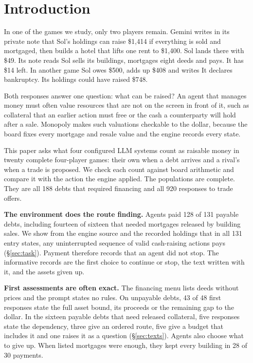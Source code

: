\section{Introduction}

In one of the games we study, only two players remain. Gemini writes in its private note that Sol's holdings can raise \$1,414 if everything is sold and mortgaged, then builds a hotel that lifts one rent to \$1,400. Sol lands there with \$49. Its note reads  Sol sells its buildings, mortgages eight deeds and pays. It has \$14 left. In another game Sol owes \$500, adds up \$408 and writes  It declares bankruptcy. Its holdings could have raised \$748.

Both responses answer one question: what can be raised? An agent that manages money must often value resources that are not on the screen in front of it, such as collateral that an earlier action must free or the cash a counterparty will hold after a sale. Monopoly makes such valuations checkable to the dollar, because the board fixes every mortgage and resale value and the engine records every state.

This paper asks what four configured LLM systems count as raisable money in twenty complete four-player games: their own when a debt arrives and a rival's when a trade is proposed. We check each count against board arithmetic and compare it with the action the engine applied. The populations are complete. They are all 188 debts that required financing and all 920 responses to trade offers.

\textbf{The environment does the route finding.} Agents paid 128 of 131 payable debts, including fourteen of sixteen that needed mortgages released by building sales. We show from the engine source and the recorded holdings that in all 131 entry states, any uninterrupted sequence of valid cash-raising actions pays (\S\ref{sec:task}). Payment therefore records that an agent did not stop. The informative records are the first choice to continue or stop, the text written with it, and the assets given up.

\textbf{First assessments are often exact.} The financing menu lists deeds without prices and the prompt states no rules. On unpayable debts, 43 of 48 first responses state the full asset bound, its proceeds or the remaining gap to the dollar. In the sixteen payable debts that need released collateral, five responses state the dependency, three give an ordered route, five give a budget that includes it and one raises it as a question (\S\ref{sec:texts}). Agents also choose what to give up. When listed mortgages were enough, they kept every building in 28 of 30 payments.

